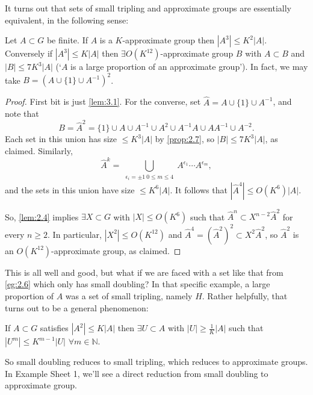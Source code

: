 \documentclass{article}
\numberwithin{equation}{section}
\begin{document}
It turns out that sets of small tripling and approximate groups are essentially equivalent, in the following sense:
\begin{nprop}\label{prop:3.2}
  Let $A \subset G$ be finite. If $A$ is a $K$-approximate group then $|A^3| \leq K^2 |A|$.
  Conversely if $|A^3| \leq K|A|$ then $\exists O(K^{12})$-approximate group $B$ with $A \subset B$ and $|B| \leq 7 K^3 |A|$ (`$A$ is a large proportion of an approximate group').
  In fact, we may take $B = (A \cup \{1\} \cup A^{-1})^2$.
\end{nprop}
\begin{proof}
  First bit is just \cref{lem:3.1}. For the converse, set $\hat{A} = A \cup \{1\} \cup A^{-1}$, and note that
  \begin{equation*}
    B = \hat{A}^2 = \{1\} \cup A \cup A^{-1} \cup A^2 \cup A^{-1} A \cup A A^{-1} \cup A^{-2}.
  \end{equation*}
  Each set in this union has size $\leq K^3 |A|$ by \cref{prop:2.7}, so $|B| \leq 7 K^3 |A|$, as claimed. Similarly,
  \begin{equation*}
    \hat{A}^k = \bigcup_{\substack{\epsilon_i = \pm 1 \ 0 \leq m \leq 4}} A^{\epsilon_1} \dotsm A^{\epsilon_m},
  \end{equation*}
  and the sets in this union have size $\leq K^6 |A|$.
  It follows that $|\hat{A}^4| \leq O(K^6)|A|$.

  So, \cref{lem:2.4} implies $\exists X \subset G$ with $|X| \leq O(K^6)$ such that $\hat{A}^n \subset X^{n-2} \hat{A}^2$ for every $n \geq 2$.
  In particular, $|X^2| \leq O(K^{12})$ and $\hat{A}^4 = (\hat{A}^2)^2 \subset X^2 \hat{A}^2$, so $\hat{A}^2$ is an $O(K^{12})$-approximate group, as claimed.
\end{proof}
This is all well and good, but what if we are faced with a set like that from \cref{eg:2.6} which only has small doubling?
In that specific example, a large proportion of $A$ was a set of small tripling, namely $H$. Rather helpfully, that turns out to be a general phenomenon:

\begin{nthm}\label{thm:3.3}
  If $A \subset G$ satisfies $|A^2| \leq K|A|$ then $\exists U \subset A$ with $|U| \geq \frac{1}{K} |A|$ such that $|U^m| \leq K^{m-1} |U|$ $\forall m \in \mathbb{N}$.
\end{nthm}
So small doubling reduces to small tripling, which reduces to approximate groups. In Example Sheet 1, we'll see a direct reduction from small doubling to approximate group.
\end{document}
